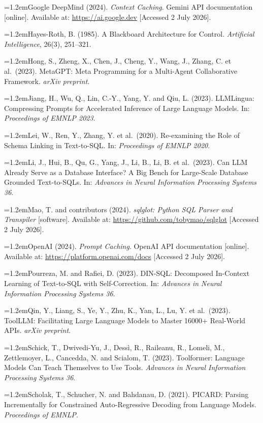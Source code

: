 \documentclass[conference]{IEEEtran}
\newcommand{\refentry}{\par\noindent\hangindent=1.2em\hangafter=1}
\begin{document}
\refentry Google DeepMind (2024). \emph{Context Caching}. Gemini API
documentation {[}online{]}. Available at: \url{https://ai.google.dev}
{[}Accessed 2 July 2026{]}.

\refentry Hayes-Roth, B. (1985). A Blackboard Architecture for Control.
\emph{Artificial Intelligence}, 26(3), 251--321.

\refentry Hong, S., Zheng, X., Chen, J., Cheng, Y., Wang, J., Zhang, C. et
al.~(2023). MetaGPT: Meta Programming for a Multi-Agent Collaborative
Framework. \emph{arXiv preprint}.

\refentry Jiang, H., Wu, Q., Lin, C.-Y., Yang, Y. and Qiu, L. (2023).
LLMLingua: Compressing Prompts for Accelerated Inference of Large Language
Models. In: \emph{Proceedings of EMNLP 2023}.

\refentry Lei, W., Ren, Y., Zhang, Y. et al.~(2020). Re-examining the Role of
Schema Linking in Text-to-SQL. In: \emph{Proceedings of EMNLP 2020}.

\refentry Li, J., Hui, B., Qu, G., Yang, J., Li, B., Li, B. et al.~(2023).
Can LLM Already Serve as a Database Interface? A Big Bench for Large-Scale
Database Grounded Text-to-SQLs. In: \emph{Advances in Neural Information
Processing Systems 36}.

\refentry Mao, T. and contributors (2024). \emph{sqlglot: Python SQL Parser
and Transpiler} {[}software{]}. Available at:
\url{https://github.com/tobymao/sqlglot} {[}Accessed 2 July 2026{]}.

\refentry OpenAI (2024). \emph{Prompt Caching}. OpenAI API documentation
{[}online{]}. Available at: \url{https://platform.openai.com/docs}
{[}Accessed 2 July 2026{]}.

\refentry Pourreza, M. and Rafiei, D. (2023). DIN-SQL: Decomposed In-Context
Learning of Text-to-SQL with Self-Correction. In: \emph{Advances in Neural
Information Processing Systems 36}.

\refentry Qin, Y., Liang, S., Ye, Y., Zhu, K., Yan, L., Lu, Y. et al.~(2023).
ToolLLM: Facilitating Large Language Models to Master 16000+ Real-World APIs.
\emph{arXiv preprint}.

\refentry Schick, T., Dwivedi-Yu, J., Dess\`{i}, R., Raileanu, R., Lomeli, M.,
Zettlemoyer, L., Cancedda, N. and Scialom, T. (2023). Toolformer: Language
Models Can Teach Themselves to Use Tools. \emph{Advances in Neural Information
Processing Systems 36}.

\refentry Scholak, T., Schucher, N. and Bahdanau, D. (2021). PICARD: Parsing
Incrementally for Constrained Auto-Regressive Decoding from Language Models.
\emph{Proceedings of EMNLP}.
\end{document}
